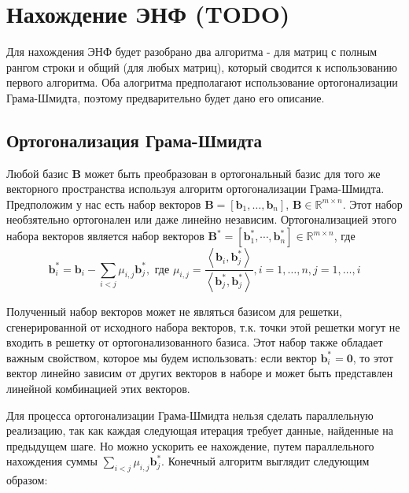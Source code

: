 \newpage

\section{Нахождение ЭНФ (TODO)}

Для нахождения ЭНФ будет разобрано два алгоритма - для матриц с полным рангом строки и общий (для любых матриц), который сводится к использованию первого алгоритма. Оба алогритма предполагают использование ортогонализации Грама-Шмидта, поэтому предварительно будет дано его описание.

\subsection{Ортогонализация Грама-Шмидта}

Любой базис $ \mathbf{B} $ может быть преобразован в ортогональный базис для того же векторного пространства используя алгоритм ортогонализации Грама-Шмидта.
Предположим у нас есть набор векторов $ \mathbf{B} = [\mathbf{b}_1, \ldots, \mathbf{b}_n] $, $ \mathbf{B} \in \mathbb{R}^{m \times n} $. Этот набор необзятельно ортогонален или даже линейно независим. Ортогонализацией этого набора векторов является набор векторов $ \mathbf{B}^* = [\mathbf{b}^*_1, \cdots, \mathbf{b}^*_n] \in \mathbb{R}^{m \times n} $, где $$ \mathbf{b}^*_i = \mathbf{b}_i - \sum_{i < j} \mu_{i, j} \mathbf{b}^*_j, \text{ где } \mu_{i, j} = \frac{\left\langle \mathbf{b}_i, \mathbf{b}^*_j \right\rangle}{\left\langle \mathbf{b}^*_j, \mathbf{b}^*_j \right\rangle}, i = 1, \ldots, n, j = 1, \ldots, i $$

Полученный набор векторов может не являться базисом для решетки, сгенерированной от исходного набора векторов, т.к. точки этой решетки могут не входить в решетку от ортогонализованного базиса. Этот набор также обладает важным свойством, которое мы будем использовать: если вектор $ \mathbf{b}^*_i = \mathbf{0} $, то этот вектор линейно зависим от других векторов в наборе и может быть представлен линейной комбинацией этих векторов.

Для процесса ортогонализации Грама-Шмидта нельзя сделать параллельную реализацию, так как каждая следующая итерация требует данные, найденные на предыдущем шаге. Но можно ускорить ее нахождение, путем параллельного нахождения суммы $ \sum_{i < j} \mu_{i, j} \mathbf{b}^*_j $. Конечный алгоритм выглядит следующим образом:

